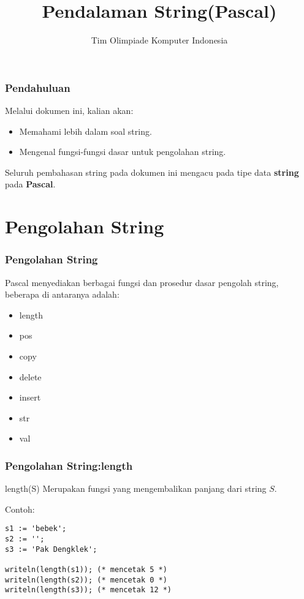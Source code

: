 \documentclass{beamer}
\title{Pendalaman String\newline (Pascal)}
\author{Tim Olimpiade Komputer Indonesia}
\begin{document}
\begin{frame}
\titlepage
\end{frame}

\begin{frame}
\frametitle{Pendahuluan}
Melalui dokumen ini, kalian akan:
\begin{itemize}
	\item Memahami lebih dalam soal string.
	\item Mengenal fungsi-fungsi dasar untuk pengolahan string.
\end{itemize}
\vfill
Seluruh pembahasan string pada dokumen ini mengacu pada tipe data \textbf{string} pada \textbf{Pascal}.
\end{frame}

\section{Pengolahan String}
\frame{\sectionpage}

\begin{frame}
\frametitle{Pengolahan String}
Pascal menyediakan berbagai fungsi dan prosedur dasar pengolah string, beberapa di antaranya adalah:
\begin{itemize}
	\item length
	\item pos
	\item copy
	\item delete
	\item insert
	\item str
	\item val
\end{itemize}
\end{frame}

\begin{frame}[fragile]
\frametitle{Pengolahan String:\newline length}
\begin{block}{length(S)}
Merupakan fungsi yang mengembalikan panjang dari string $S$.
\end{block}

Contoh:
\begin{lstlisting}
s1 := 'bebek';
s2 := '';
s3 := 'Pak Dengklek';

writeln(length(s1)); (* mencetak 5 *)
writeln(length(s2)); (* mencetak 0 *)
writeln(length(s3)); (* mencetak 12 *)
\end{lstlisting}
\end{frame}
\end{document}
